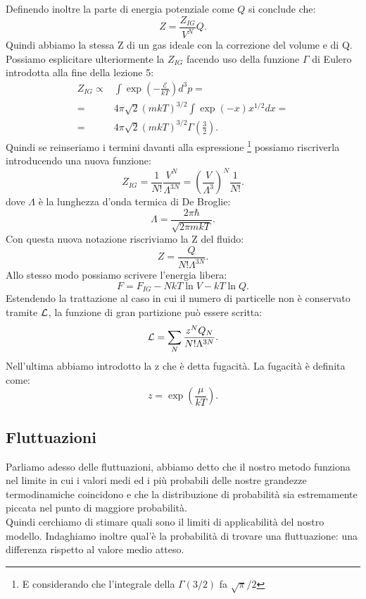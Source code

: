 Definendo inoltre la parte di energia potenziale come $Q$ si conclude che:
\[
	Z = \frac{Z_{IG}}{V^{N}}Q
.\] 
Quindi abbiamo la stessa Z di un gas ideale con la correzione del volume e di Q. \\
Possiamo esplicitare ulteriormente la $Z_{IG}$ facendo uso della funzione $\Gamma$ di Eulero introdotta alla fine della lezione 5:
\begin{align}
	Z_{IG} \propto& \int \exp\left( -\frac{\mathcal{E}}{kT} \right) d^3p = \\
	=& 4\pi\sqrt{2} \left( mkT \right) ^{3 /2} \int \exp\left( -x \right) x^{1 /2}dx=\\
	=&4\pi\sqrt{2} \left( mkT \right) ^{3 /2} \Gamma\left( \frac{3}{2} \right) 
.\end{align}
Quindi se reinseriamo i termini davanti alla espressione \footnote{E considerando che l'integrale della $\Gamma\left( 3 / 2 \right)$ fa $\sqrt{\pi}/2$} possiamo riscriverla introducendo una nuova funzione:
 \[
	 Z_{IG} = \frac{1}{N!} \frac{V^{N}}{\Lambda^{3N}} = \left( \frac{V}{\Lambda^3} \right)^{N} \frac{1}{N!} 
.\] 
dove $\Lambda$ è la lunghezza d'onda termica di De Broglie: 
\[
	\Lambda = \frac{2\pi \hbar }{\sqrt{2\pi m kT} }
.\] 
Con questa nuova notazione riscriviamo la Z del fluido:
\[
	Z = \frac{Q}{N! \Lambda^{3N}}
.\] 
Allo stesso modo possiamo scrivere l'energia libera:
\[
	F = F_{IG}- NkT \ln V - kT \ln Q
.\] 
Estendendo la trattazione al caso in cui il numero di particelle non è conservato tramite $\mathcal{L}$, la funzione di gran partizione può essere scritta:
\[
	\mathcal{L} = \sum_{N}^{} \frac{z^{N} Q_{N}}{N! \Lambda^{3N}}
.\] 
Nell'ultima abbiamo introdotto la z che è detta fugacità. La fugacità è definita come: 
\[
	z = \exp\left( \frac{\mu}{kT} \right) 
.\] 
\subsection{Fluttuazioni}%
Parliamo adesso delle fluttuazioni, abbiamo detto che il nostro metodo funziona nel limite in cui i valori medi ed i più probabili delle nostre grandezze termodinamiche coincidono e che la distribuzione di probabilità sia estremamente piccata nel punto di maggiore probabilità.\\
Quindi cerchiamo di stimare quali sono il limiti di applicabilità del nostro modello. Indaghiamo inoltre qual'è la probabilità di trovare una fluttuazione: una differenza rispetto al valore medio atteso.\\
